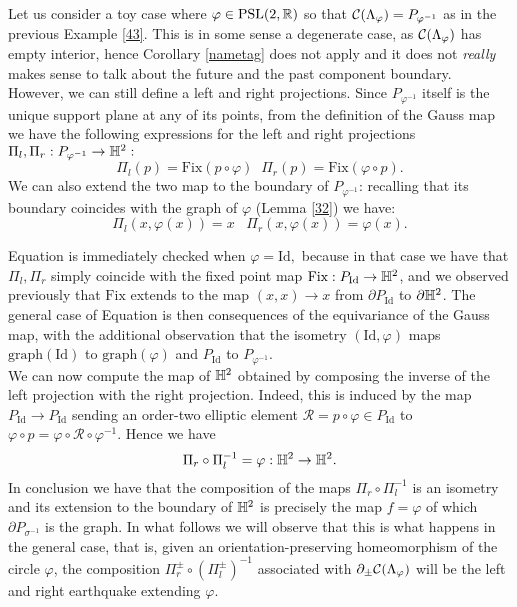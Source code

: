 \begin{example}\label{413} Let us consider a toy case where $\varphi\in\text{PSL}(2,\mathbb{R})$ so that $\mathcal{C}(\Lambda_\varphi)=P_{\varphi^{-1}}$ as in the previous Example \ref{43}. This is in some sense a degenerate case, as $\mathcal{C}(\Lambda_\varphi)$ has empty interior, hence Corollary \ref{nametag} does not apply and it does not \textit{really} makes sense to talk about the future and the past component boundary. However, we can still define a left and right projections. Since $P_{\varphi^{-1}}$ itself is the unique support plane at any of its points, from the definition of the Gauss map we have the following expressions for the left and right projections $\Pi_l,\Pi_r:P_{\varphi^{-1}}\to\mathbb{H}^2:$
\begin{equation}
    \Pi_l(p)=\text{Fix}(p\circ\varphi)\;\;\Pi_r(p)=\text{Fix}(\varphi\circ p).
\end{equation}   
We can also extend the two map to the boundary of $P_{\varphi^{-1}}$: recalling that its boundary coincides with the graph of $\varphi$ (Lemma \ref{32}) we have: 
\begin{equation}\label{simproj}
    \Pi_l(x,\varphi(x))=x \;\;\;\Pi_r(x,\varphi(x))=\varphi(x). 
\end{equation}

Equation  is immediately checked when $\varphi=\text{Id},$ because in that case we have that $\Pi_l,\Pi_r$ simply coincide with the fixed point map $\text{Fix}:P_{\text{Id}}\to\mathbb{H}^2$, and we observed previously that $\text{Fix}$ extends to the map $(x,x)\to x$ from $\partial P_{\text{Id}}$ to $\partial\mathbb{H}^2$. The general case of Equation  is then consequences of the equivariance of the Gauss map, with the additional observation that the isometry $(\text{Id},\varphi)$ maps $\text{graph}(\text{Id})$ to $\text{graph}(\varphi)$ and $P_\text{Id}$ to $P_{\varphi^{-1}}$. \\
We can now compute the map of $\mathbb{H}^2$ obtained by composing the inverse of the left projection with the right projection. Indeed, this is induced by the map $P_{\text{Id}}\to P_\text{Id}$ sending an order-two elliptic element $\mathcal{R}=p\circ\varphi\in P_{\text{Id}}$ to $\varphi\circ p=\varphi\circ\mathcal{R}\circ\varphi^{-1}$. Hence we have   
\begin{equation}\label{composition}
    \Pi_r\circ\Pi_l^{-1}=\varphi:\mathbb{H}^2\to\mathbb{H}^2.
\end{equation}
In conclusion we have that the composition of the maps $\Pi_r\circ\Pi_l^{-1}$ is an isometry and its extension to the boundary of $\mathbb{H}^2$ is precisely the map $f=\varphi$ of which $\partial P_{\sigma^{-1}}$ is the graph. In what follows we will observe that this is what happens in the general case, that is, given an orientation-preserving homeomorphism of the circle $\varphi$, the composition $\Pi_r^\pm\circ(\Pi_l^\pm)^{-1}$ associated with $\partial_\pm\mathcal{C}(\Lambda_\varphi)$ will be the left and right earthquake extending $\varphi$.
\end{example}

